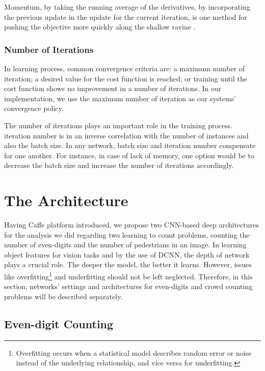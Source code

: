 Momentum, by taking the running average of the derivatives, by incorporating the previous update in the update for the current iteration, is one method for pushing the objective more quickly along the shallow ravine \cite{sgd}. 

\subsubsection{Number of Iterations}

In learning process, common convergence criteria are: a maximum number of iteration; a desired value for the cost function is reached; or training until the cost function shows no improvement in a number of iterations. In our implementation, we use the maximum number of iteration as our systems' convergence policy. 
 
The number of iterations plays an important role in the training process. iteration number is in an inverse correlation with the number of instances and also the batch size. In any network, batch size and iteration number compensate for one another. For instance, in case of lack of memory, one option would be to decrease the batch size and increase the number of iterations accordingly.


\section{The Architecture}
\label{imparch}

Having Caffe platform introduced, we propose two CNN-based deep architectures for the analysis we did regarding two learning to count problems, counting the number of even-digits and the number of pedestrians in an image.  
In learning object features for vision tasks and by the use of DCNN, the depth of network plays a crucial role. The deeper the model, the better it learns. However, issues like overfitting\footnote{Overfitting occurs when a statistical model describes random error or noise instead of the underlying relationship, and vice versa for underfitting. } and underfitting should not be left neglected.   
Therefore, in this section, networks' settings and architectures for even-digits and crowd counting problems will be described separately. 

\subsection{Even-digit Counting}
\label{subsubsec:digitarch}

